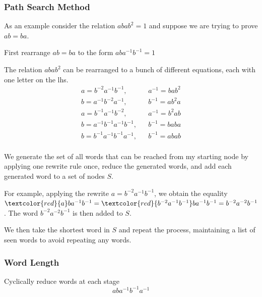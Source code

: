 \documentclass{beamer}
\begin{document}
\begin{frame}
  \frametitle{Path Search Method}
    As an example consider the relation $abab^2 = 1$ and suppose we are trying to
    prove $ab = ba$. \newline

    First rearrange $ab=ba$ to the form $aba^{-1}b^{-1}=1$ \newline

    The relation $abab^2$ can be rearranged to a bunch of different equations,
    each with one letter on the lhs.
    \begin{equation*}
      \begin{aligned}
        a = b^{-2}a^{-1}b^{-1}, && a^{-1} = bab^2 \\
        b = a^{-1}b^{-2}a^{-1}, && b^{-1} = ab^2a \\
        a = b^{-1}a^{-1}b^{-2}, && a^{-1}=b^2ab \\
        b = a^{-1}b^{-1}a^{-1}b^{-1}, && b^{-1} = baba \\
        b = b^{-1}a^{-1}b^{-1}a^{-1}, && b^{-1} = abab \\
      \end{aligned}
    \end{equation*}
\end{frame}

\begin{frame}
  We generate the set of all words that can be reached from my starting node by
  applying one rewrite rule once,
  reduce the generated words, and add each generated word to a set of nodes $S$. \newline

  For example, applying the rewrite $a=b^{-2}a^{-1}b^{-1}$, we obtain the equality
  $\textcolor{red}{a}ba^{-1}b^{-1} = \textcolor{red}{b^{-2}a^{-1}b^{-1}}ba^{-1}b^{-1} =
  b^{-2}a^{-2}b^{-1}$. The word $b^{-2}a^{-2}b^{-1}$ is then added to $S$.
  \newline

  We then take the shortest word in $S$ and repeat the process,
  maintaining a list of seen words to avoid repeating any words.

\end{frame}

\begin{frame}
  \frametitle{Word Length}
  Cyclically reduce words at each stage
  \begin{equation*}
    aba^{-1}b^{-1}a^{-1}
  \end{equation*}
\end{frame}
\end{document}
